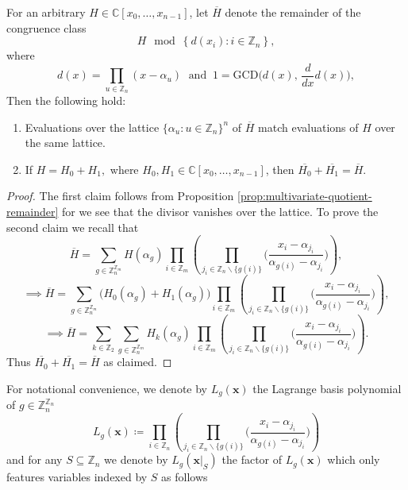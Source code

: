 \begin{proposition}\label{prop:ring-homomorphism}
For an arbitrary $H\in\mathbb{C}\left[x_{0},\ldots,x_{n-1}\right]$, let $\overline{H}$ denote
the {remainder} of the congruence class 
\[
H\mod\left\{ d(x_{i}):i\in\mathbb{Z}_{n}\right\} ,
\]
where
\[
d(x)=\prod_{u\in\mathbb{Z}_{n}}(x-\alpha_{u})\;\text{ and }\:1=\text{GCD}\big(d(x),\,\frac{d}{dx}d(x)\big),
\]
Then the following hold:
\begin{enumerate}
    \item Evaluations over the  lattice $\{\alpha_{u}:u\in\mathbb{Z}_{n}\}^{n}$ of $\overline{H}$ match evaluations of $H$ over the same lattice. 
    \item If $H = H_0 + H_1,$ where $H_0, H_1 \in \mathbb{C}\left[x_{0},\ldots,x_{n-1}\right]$, then $\overline{H_0} + \overline{H_1} = \overline{H}$.
\end{enumerate}
 \end{proposition}
\begin{proof}
  The first claim follows from Proposition \ref{prop:multivariate-quotient-remainder} for we see that the divisor vanishes over the lattice. To prove the second claim we recall that
  \[
\overline{H}=\sum_{g\in\mathbb{Z}_{n}^{\mathbb{Z}_{m}}}H(\alpha_{g})\prod_{i\in\mathbb{Z}_{m}}\left(\prod_{j_{i}\in\mathbb{Z}_{n}\backslash\{g(i)\}}\bigg(\frac{x_{i}-\alpha_{j_{i}}}{\alpha_{g(i)}-\alpha_{j_{i}}}\bigg)\right),
  \]
  \[
  \implies\overline{H}=\sum_{g\in\mathbb{Z}_{n}^{\mathbb{Z}_{m}}}\big(H_{0}(\alpha_{g})+H_{1}(\alpha_{g})\big)\prod_{i\in\mathbb{Z}_{m}}\left(\prod_{j_{i}\in\mathbb{Z}_{n}\backslash\{g(i)\}}\bigg(\frac{x_{i}-\alpha_{j_{i}}}{\alpha_{g(i)}-\alpha_{j_{i}}}\bigg)\right),
  \]
  \[
  \implies\overline{H}=\sum_{k\in\mathbb{Z}_{2}}\sum_{g\in\mathbb{Z}_{n}^{\mathbb{Z}_{m}}}H_{k}(\alpha_{g})\prod_{i\in\mathbb{Z}_{m}}\left(\prod_{j_{i}\in\mathbb{Z}_{n}\backslash\{g(i)\}}\bigg(\frac{x_{i}-\alpha_{j_{i}}}{\alpha_{g(i)}-\alpha_{j_{i}}}\bigg)\right).
  \]
  Thus $\overline{H_0} + \overline{H_1} = \overline{H}$ as claimed.
\end{proof}
For notational convenience, we denote by $L_{g}(\mathbf{x})$ the Lagrange basis polynomial of $g\in\mathbb{Z}_{n}^{\mathbb{Z}_{n}}$  
\[
L_{g}(\mathbf{x})\coloneq\prod_{i\in\mathbb{Z}_{n}}\left(\prod_{j_{i}\in\mathbb{Z}_{n}\backslash\{g(i)\}}\bigg(\frac{x_{i}-\alpha_{j_{i}}}{\alpha_{g(i)}-\alpha_{j_{i}}}\bigg)\right)
\]
and for any $S\subseteq \mathbb{Z}_n$ we denote  by $L_{g}(\mathbf{x}|_{S})$ the factor of $L_{g}(\mathbf{x})$ which only features variables indexed by $S$ as follows
